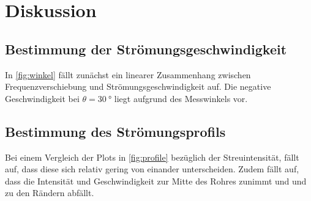 \section{Diskussion}
\label{sec:Diskussion}

\subsection{Bestimmung der Strömungsgeschwindigkeit}

In \autoref{fig:winkel} fällt zunächst ein linearer Zusammenhang zwischen Frequenzverschiebung und Strömungsgeschwindigkeit auf. 
Die negative Geschwindigkeit bei $\theta = \qty{30}{°}$ liegt aufgrund des Messwinkels vor.


\subsection{Bestimmung des Strömungsprofils}

Bei einem Vergleich der Plots in \autoref{fig:profile} bezüglich der Streuintensität, fällt auf,
dass diese sich relativ gering von einander unterscheiden. Zudem fällt auf, dass die
Intensität und Geschwindigkeit zur Mitte des Rohres zunimmt und und zu den Rändern
abfällt.